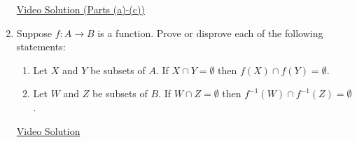 \begin{enumerate}
\href{https://youtu.be/A6m4O8GvGy8}{Video Solution (Parts (a)-(c))}

\item Suppose $f : A \to B$ is a function. Prove or disprove each of the following statements:
\begin{enumerate}
    \item Let $X$ and $Y$ be subsets of $A$. If $X \cap Y = \emptyset$ then $f(X) \cap f(Y) = \emptyset$.
    \item Let $W$ and $Z$ be subsets of $B$. If $W \cap Z = \emptyset$ then $f^{-1}(W)  \cap f^{-1}(Z) = \emptyset$. 
\end{enumerate}

\href{https://youtu.be/pVmf28Cg_Y8}{Video Solution}
\end{enumerate}
